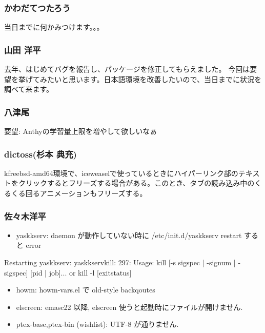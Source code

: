 \documentclass[cjk,dvipdfmx,12pt,%
hyperref={bookmarks=true,bookmarksnumbered=true,bookmarksopen=false,%
colorlinks=false,%
pdftitle={第 43 回 関西 Debian 勉強会},%
pdfauthor={倉敷・のがた・佐々木},%
pdfsubject={資料},%
}]{beamer}
\begin{document}
\begin{frame}[fragile]
\frametitle{ かわだてつたろう }

当日までに何かみつけます。。。

\end{frame}

\begin{frame}[fragile]
\frametitle{ 山田 洋平 }

去年、はじめてバグを報告し、パッケージを修正してもらえました。
今回は要望を挙げてみたいと思います。日本語環境を改善したいので、当日までに状況を調べて来ます。

\end{frame}

\begin{frame}[fragile]
\frametitle{ 八津尾 }

要望: Anthyの学習量上限を増やして欲しいなぁ

\end{frame}

\begin{frame}[fragile]
\frametitle{ dictoss(杉本 典充) }

kfreebsd-amd64環境で、iceweaselで使っているときにハイパーリンク部のテキストをクリックするとフリーズする場合がある。このとき、タブの読み込み中のくるくる回るアニメーションもフリーズする。
\end{frame}



\begin{frame}[fragile]
\frametitle{ 佐々木洋平 }
\begin{itemize}
\item
  yaskkserv: daemon が動作していない時に /etc/init.d/yaskkserv restart すると error
\end{itemize}
    \begin{commandline}
Restarting yaskkserv: yaskkservkill: 297: Usage: kill [-s sigspec | -signum | -sigspec] [pid | job]... or
kill -l [exitstatus]
    \end{commandline}
    \begin{itemize}
    \item howm: howm-vars.el で old-style backqoutes
    \item elscreen: emasc22 以降, elscreen 使うと起動時にファイルが開けません.
    \item ptex-base,ptex-bin (wishlist): UTF-8 が通りません.
    \end{itemize}
\end{frame}
\end{document}
